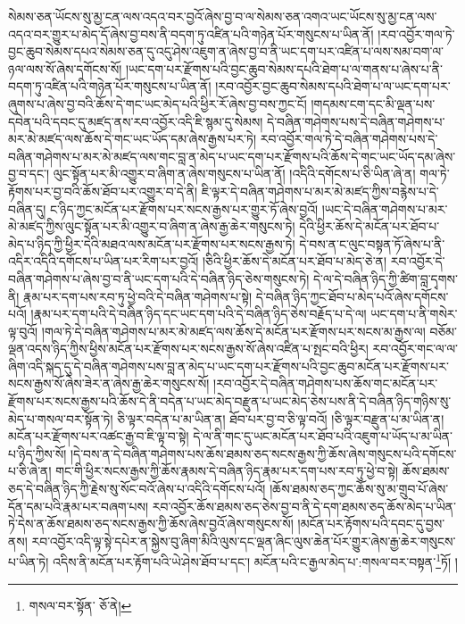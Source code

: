 སེམས་ཅན་ཡོངས་སུ་མྱ་ངན་ལས་འདའ་བར་བྱའོ་ཞེས་བྱ་བ་ལ་སེམས་ཅན་འགའ་ཡང་ཡོངས་སུ་མྱ་ངན་ལས་འདའ་བར་གྱུར་པ་མེད་དོ་ཞེས་བྱ་བས་ནི་བདག་ཏུ་འཛིན་པའི་གཉེན་པོར་གསུངས་པ་ཡིན་ནོ། །རབ་འབྱོར་གལ་ཏེ་བྱང་ཆུབ་སེམས་དཔའ་སེམས་ཅན་དུ་འདུ་ཤེས་འཇུག་ན་ཞེས་བྱ་བ་ནི་ཡང་དག་པར་འཛིན་པ་ལས་སམ་བག་ལ་ཉལ་ལས་སོ་ཞེས་དགོངས་སོ། །ཡང་དག་པར་རྫོགས་པའི་བྱང་ཆུབ་སེམས་དཔའི་ཐེག་པ་ལ་གནས་པ་ཞེས་པ་ནི་བདག་ཏུ་འཛིན་པའི་གཉེན་པོར་གསུངས་པ་ཡིན་ནོ། །རབ་འབྱོར་བྱང་ཆུབ་སེམས་དཔའི་ཐེག་པ་ལ་ཡང་དག་པར་ཞུགས་པ་ཞེས་བྱ་བའི་ཆོས་དེ་གང་ཡང་མེད་པའི་ཕྱིར་རོ་ཞེས་བྱ་བས་ཀྱང་ངོ། །གདམས་ངག་དང་མི་ལྡན་པས་དབེན་པའི་དབང་དུ་མཛད་ནས་རབ་འབྱོར་འདི་ཇི་སྙམ་དུ་སེམས། དེ་བཞིན་གཤེགས་པས་དེ་བཞིན་གཤེགས་པ་མར་མེ་མཛད་ལས་ཆོས་དེ་གང་ཡང་ཡོད་དམ་ཞེས་རྒྱས་པར་ཏེ། རབ་འབྱོར་གལ་ཏེ་དེ་བཞིན་གཤེགས་པས་དེ་བཞིན་གཤེགས་པ་མར་མེ་མཛད་ལས་གང་བླ་ན་མེད་པ་ཡང་དག་པར་རྫོགས་པའི་ཆོས་དེ་གང་ཡང་ཡོད་དམ་ཞེས་བྱ་བ་དང་། ལུང་སྟོན་པར་མི་འགྱུར་བ་ཞིག་ན་ཞེས་གསུངས་པ་ཡིན་ནོ། །འདིའི་དགོངས་པ་ཅི་ཡིན་ཞེ་ན། གལ་ཏེ་རྟོགས་པར་བྱ་བའི་ཆོས་ཐོབ་པར་འགྱུར་བ་དེ་ནི། ཇི་ལྟར་དེ་བཞིན་གཤེགས་པ་མར་མེ་མཛད་ཀྱིས་བརྙེས་པ་དེ་བཞིན་དུ། ང་ཉིད་ཀྱང་མངོན་པར་རྫོགས་པར་སངས་རྒྱས་པར་གྱུར་ཏོ་ཞེས་བྱའོ། །ཡང་དེ་བཞིན་གཤེགས་པ་མར་མེ་མཛད་ཀྱིས་ལུང་སྟོན་པར་མི་འགྱུར་བ་ཞིག་ན་ཞེས་རྒྱ་ཆེར་གསུངས་ཏེ། དེའི་ཕྱིར་ཆོས་དེ་མངོན་པར་ཐོབ་པ་མེད་པ་ཉིད་ཀྱི་ཕྱིར་དེའི་མཐའ་ལས་མངོན་པར་རྫོགས་པར་སངས་རྒྱས་ཏེ། དེ་བས་ན་ང་ལུང་བསྟན་ཏོ་ཞེས་པ་ནི་འདིར་འདིའི་དགོངས་པ་ཡིན་པར་རིག་པར་བྱའོ། །ཅིའི་ཕྱིར་ཆོས་དེ་མངོན་པར་ཐོབ་པ་མེད་ཅེ་ན། རབ་འབྱོར་དེ་བཞིན་གཤེགས་པ་ཞེས་བྱ་བ་ནི་ཡང་དག་པའི་དེ་བཞིན་ཉིད་ཅེས་གསུངས་ཏེ། དེ་ལ་དེ་བཞིན་ཉིད་ཀྱི་ཚིག་བླ་དྭགས་ནི། རྣམ་པར་དག་པས་རབ་ཏུ་ཕྱེ་བའི་དེ་བཞིན་གཤེགས་པ་སྟེ། དེ་བཞིན་ཉིད་ཀྱང་ཐོབ་པ་མེད་པའོ་ཞེས་དགོངས་པའོ། །རྣམ་པར་དག་པའི་དེ་བཞིན་ཉིད་དང་ཡང་དག་པའི་དེ་བཞིན་ཉིད་ཅེས་བརྗོད་པ་དེ་ལ། ཡང་དག་པ་ནི་གསེར་ལྟ་བུའོ། །གལ་ཏེ་དེ་བཞིན་གཤེགས་པ་མར་མེ་མཛད་ལས་ཆོས་དེ་མངོན་པར་རྫོགས་པར་སངས་མ་རྒྱས་ལ། བཅོམ་ལྡན་འདས་ཉིད་ཀྱིས་ཕྱིས་མངོན་པར་རྫོགས་པར་སངས་རྒྱས་སོ་ཞེས་འཛིན་པ་སྤང་བའི་ཕྱིར། རབ་འབྱོར་གང་ལ་ལ་ཞིག་འདི་སྐད་དུ་དེ་བཞིན་གཤེགས་པས་བླ་ན་མེད་པ་ཡང་དག་པར་རྫོགས་པའི་བྱང་ཆུབ་མངོན་པར་རྫོགས་པར་སངས་རྒྱས་སོ་ཞེས་ཟེར་ན་ཞེས་རྒྱ་ཆེར་གསུངས་སོ། །རབ་འབྱོར་དེ་བཞིན་གཤེགས་པས་ཆོས་གང་མངོན་པར་རྫོགས་པར་སངས་རྒྱས་པའི་ཆོས་དེ་ནི་བདེན་པ་ཡང་མེད་བརྫུན་པ་ཡང་མེད་ཅེས་པས་ནི་དེ་བཞིན་ཉིད་གཉིས་སུ་མེད་པ་གསལ་བར་སྟོན་ཏེ། ཅི་ལྟར་བདེན་པ་མ་ཡིན་ན། ཐོབ་པར་བྱ་བ་ཅི་ལྟ་བའོ། །ཅི་ལྟར་བརྫུན་པ་མ་ཡིན་ན། མངོན་པར་རྫོགས་པར་འཚང་རྒྱ་བ་ཇི་ལྟ་བ་སྟེ། དེ་ལ་ནི་གང་དུ་ཡང་མངོན་པར་ཐོབ་པའི་འཇུག་པ་ཡོད་པ་མ་ཡིན་པ་ཉིད་ཀྱིས་སོ། །དེ་བས་ན་དེ་བཞིན་གཤེགས་པས་ཆོས་ཐམས་ཅད་སངས་རྒྱས་ཀྱི་ཆོས་ཞེས་གསུངས་པའི་དགོངས་པ་ཅི་ཞེ་ན། གང་གི་ཕྱིར་སངས་རྒྱས་ཀྱི་ཆོས་རྣམས་དེ་བཞིན་ཉིད་རྣམ་པར་དག་པས་རབ་ཏུ་ཕྱེ་བ་སྟེ། ཆོས་ཐམས་ཅད་དེ་བཞིན་ཉིད་ཀྱི་རྗེས་སུ་སོང་བའོ་ཞེས་པ་འདིའི་དགོངས་པའོ། །ཆོས་ཐམས་ཅད་ཀྱང་ཆོས་སུ་མ་གྲུབ་པོ་ཞེས་དོན་དམ་པའི་རྣམ་པར་བཞག་པས། རབ་འབྱོར་ཆོས་ཐམས་ཅད་ཅེས་བྱ་བ་ནི་དེ་དག་ཐམས་ཅད་ཆོས་མེད་པ་ཡིན་ཏེ་དེས་ན་ཆོས་ཐམས་ཅད་སངས་རྒྱས་ཀྱི་ཆོས་ཞེས་བྱའོ་ཞེས་གསུངས་སོ། །མངོན་པར་རྟོགས་པའི་དབང་དུ་བྱས་ནས། རབ་འབྱོར་འདི་ལྟ་སྟེ་དཔེར་ན་སྐྱེས་བུ་ཞིག་མིའི་ལུས་དང་ལྡན་ཞིང་ལུས་ཆེན་པོར་གྱུར་ཞེས་རྒྱ་ཆེར་གསུངས་པ་ཡིན་ཏེ། འདིས་ནི་མངོན་པར་རྟོག་པའི་ཡེ་ཤེས་ཐོབ་པ་དང་། མངོན་པའི་ང་རྒྱལ་མེད་པ་:གསལ་བར་བསྟན་\footnote{གསལ་བར་སྟོན་  ཅོ་ནེ། }ཏོ། །
